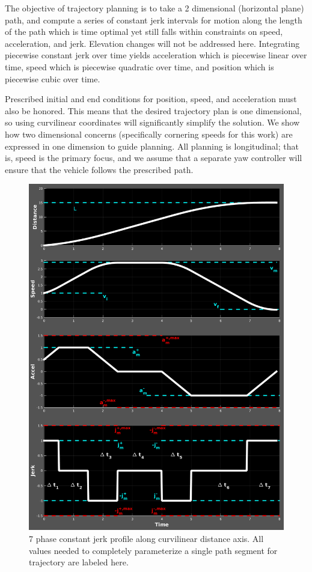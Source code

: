\documentclass[letterpaper, 10 pt, conference]{ieeeconf}  %
\begin{document}
The objective of trajectory planning is to take a 2 dimensional (horizontal plane) path, and compute a series of constant jerk intervals for motion along the length of the path which is time optimal yet still falls within constraints on speed, acceleration, and jerk.
Elevation changes will not be addressed here.
Integrating piecewise constant jerk over time yields acceleration which is piecewise linear over time, speed which is piecewise quadratic over time, and position which is piecewise cubic over time.

Prescribed initial and end conditions for position, speed, and acceleration must also be honored.
This means that the desired trajectory plan is one dimensional, so using curvilinear coordinates will significantly simplify the solution.
We show how two dimensional concerns (specifically cornering speeds for this work) are expressed in one dimension to guide planning.
All planning is longitudinal; that is, speed is the primary focus, and we assume that a separate yaw controller will ensure that the vehicle follows the prescribed path.

\begin{figure}[thpb]
  \centering
  \includegraphics[width=1.0\columnwidth]{graphics/Full7PhaseSpecVertical.png}
  \caption{
    7 phase constant jerk profile along curvilinear distance axis.
    All values needed to completely parameterize a single path segment for trajectory are labeled here.}
  \label{fig:full7phasespec}
\end{figure}
\end{document}
